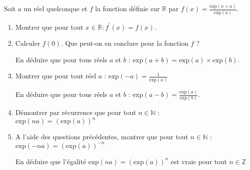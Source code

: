 
%

\bigskip
Soit $a$ un réel quelconque et $ f $ la fonction définie sur $\mathbb{R}$ par $f\left(x\right)=\frac{\text{exp}\left(x+a\right)}{\text{exp}\left(a\right)}$.
\begin{enumerate}
     \item
     Montrer que pour tout $x \in  \mathbb{R} : f^{\prime}\left(x\right)=f\left(x\right)$.
     \item
     Calculer $f\left(0\right)$. Que peut-on en conclure pour la fonction $f$ ?
     \par
     En déduire que pour tous réels $a$ et $b$ : $\text{exp}\left(a+b\right)=\text{exp}\left(a\right)\times \text{exp}\left(b\right)$.
     \item
     Montrer que pour tout réel $a$ : $\text{exp}\left(-a\right)=\frac{1}{\text{exp}\left(a\right)}$
     \par
     En déduire que pour tous réels $a$ et $b$ : $\text{exp}\left(a-b\right)=\frac{\text{exp}\left(a\right)}{\text{exp}\left(b\right)}$.
     \item
     Démontrer par récurrence que pour tout $n \in  \mathbb{N}$ :
\\
     $\text{exp}\left(na\right) = \left(\text{exp}\left(a\right)\right)^{n}$
     \item
     A l'aide des questions précédentes, montrer que pour tout $n \in  \mathbb{N}$ :
\\
     $\text{exp}\left(-na\right) = \left(\text{exp}\left(a\right)\right)^{-n}$
     \par
     En déduire que l'égalité $\text{exp}\left(na\right) = \left(\text{exp}\left(a\right)\right)^{n}$ est vraie pour tout $n \in  \mathbb{Z}$
\end{enumerate}

